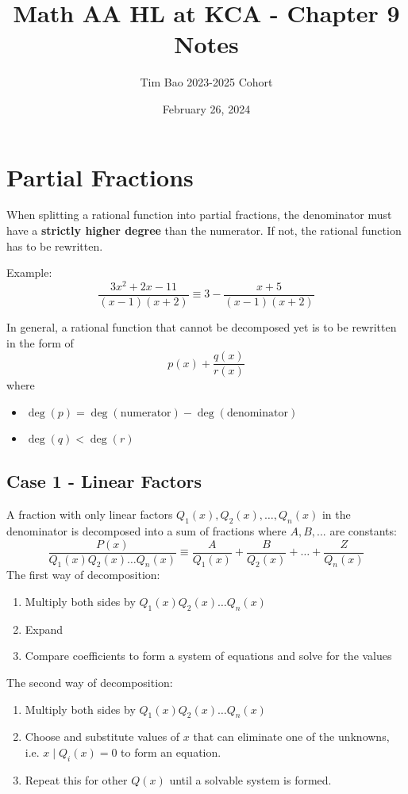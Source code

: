 \documentclass[11pt]{article}
\title{Math AA HL at KCA - Chapter 9 Notes}
\author{Tim Bao 2023-2025 Cohort}
\date{February 26, 2024}
\begin{document}
\maketitle
\pagebreak
\tableofcontents
\pagebreak

\section{Partial Fractions}

When splitting a rational function into partial fractions, the denominator must have a \textbf{strictly higher degree} than the numerator. If not, the rational function has to be rewritten.

\noindent Example: $$\frac{3x^2 + 2x - 11}{(x-1)(x+2)} \equiv 3 - \frac{x+5}{(x - 1)(x + 2)}$$

\noindent In general, a rational function that cannot be decomposed yet is to be rewritten in the form of $$p(x) + \frac{q(x)}{r(x)}$$
where
\begin{itemize}
  \item $\deg(p) = \deg(\text{numerator}) - \deg(\text{denominator})$
  \item $\deg(q) < \deg(r)$
\end{itemize}

\subsection{Case 1 - Linear Factors}

A fraction with only linear factors $Q_1(x), Q_2(x), \dots, Q_n(x)$ in the denominator is decomposed into a sum of fractions where $A, B, ...$ are constants:
$$\frac{P(x)}{Q_1(x)Q_2(x)\dots Q_n(x)} \equiv \frac{A}{Q_1(x)} + \frac{B}{Q_2(x)} + \dots + \frac{Z}{Q_n(x)}$$
The first way of decomposition:
\begin{enumerate}
  \item Multiply both sides by $Q_1(x)Q_2(x)\dots Q_n(x)$
  \item Expand
  \item Compare coefficients to form a system of equations and solve for the values
\end{enumerate}
The second way of decomposition:
\begin{enumerate}
  \item Multiply both sides by $Q_1(x)Q_2(x)\dots Q_n(x)$
  \item Choose and substitute values of $x$ that can eliminate one of the unknowns, i.e. $x \mid Q_i(x) = 0$ to form an equation.
  \item Repeat this for other $Q(x)$ until a solvable system is formed.
\end{enumerate}
\end{document}
